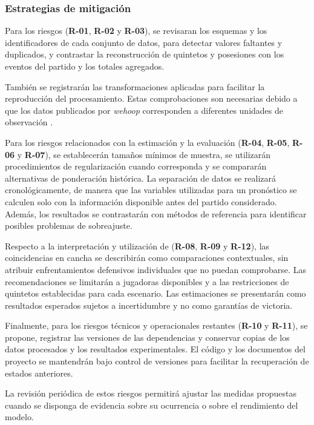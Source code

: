 \subsubsection*{Estrategias de mitigación}

Para los riesgos (\textbf{R-01}, \textbf{R-02} y \textbf{R-03}), se revisaran los esquemas y los identificadores de cada conjunto de datos,  para detectar valores faltantes y duplicados, y contrastar la reconstrucción de quintetos y posesiones con los eventos del partido y los totales agregados. 

También se registrarán las transformaciones aplicadas para facilitar la reproducción del procesamiento. Estas comprobaciones son necesarias debido a que los datos publicados por \textit{wehoop} corresponden a diferentes unidades de observación \cite{wehoopRepositorio,wehoopPbp,wehoopLineups}.

Para los riesgos relacionados con la estimación y la evaluación (\textbf{R-04}, \textbf{R-05}, \textbf{R-06} y \textbf{R-07}), se establecerán tamaños mínimos de muestra, se utilizarán procedimientos de regularización cuando corresponda y se compararán alternativas de ponderación histórica. La separación de datos se realizará cronológicamente, de manera que las variables utilizadas para un pronóstico se calculen solo con la información disponible antes del partido considerado. Además, los resultados se contrastarán con métodos de referencia para identificar posibles problemas de sobreajuste.

Respecto a la interpretación y utilización de  (\textbf{R-08}, \textbf{R-09} y \textbf{R-12}), las coincidencias en cancha se describirán como comparaciones contextuales, sin atribuir enfrentamientos defensivos individuales que no puedan comprobarse. Las recomendaciones se limitarán a jugadoras disponibles y a las restricciones de quintetos establecidas para cada escenario. Las estimaciones se presentarán como resultados esperados sujetos a incertidumbre y no como garantías de victoria.

Finalmente, para los riesgos técnicos y operacionales restantes (\textbf{R-10} y \textbf{R-11}), se propone, registrar las versiones de las dependencias y conservar copias de los datos procesados y los resultados experimentales. El código y los documentos del proyecto se mantendrán bajo control de versiones para facilitar la recuperación de estados anteriores.

La revisión periódica de estos riesgos permitirá ajustar las medidas propuestas cuando se disponga de evidencia sobre su ocurrencia o sobre el rendimiento del modelo.